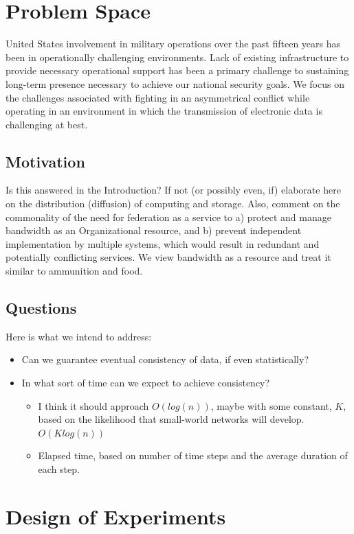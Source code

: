 \documentclass[10pt]{./IEEEtran}
\begin{document}


\section{Problem Space}
United States involvement in military operations over the past fifteen years has been in operationally challenging environments.  Lack of existing infrastructure to provide necessary operational support has been a primary challenge to sustaining long-term presence necessary to achieve our national security goals.  We focus on the challenges associated with fighting in an asymmetrical conflict while operating in an environment in which the transmission of electronic data is challenging at best.

\subsection{Motivation}
Is this answered in the Introduction?  If not (or possibly even, if) elaborate here on the distribution (diffusion) of computing and storage.  Also, comment on the commonality of the need for federation as a service to a) protect and manage bandwidth as an Organizational resource, and b) prevent independent implementation by multiple systems, which would result in redundant and potentially conflicting services.  We view bandwidth as a resource and treat it similar to ammunition and food.


\subsection{Questions}
Here is what we intend to address:
\begin{itemize}
	\item Can we guarantee eventual consistency of data, if even statistically?
	\item In what sort of time can we expect to achieve consistency?
	\begin{itemize}
		\item I think it should approach $O(log(n))$, maybe with some constant, $K$, based on the likelihood that small-world networks will develop.  $O(K log(n))$
		\item Elapsed time, based on number of time steps and the average duration of each step.
	\end{itemize}
\end{itemize}


\section{Design of Experiments}
\end{document}
